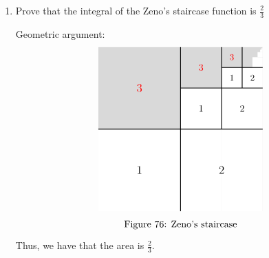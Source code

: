 \documentclass[11pt]{article}
\begin{document}
\begin{enumerate}
    \item 
    \begin{problem}
    Prove that the integral of the Zeno’s staircase function is $\frac{2}{3}$
    \end{problem}
    \begin{solution}
Geometric argument:
\[\begin{tikzpicture}
        \fill[gray!30] (0,0) rectangle (6,6);

        \fill[white] (0,0) rectangle (3,3);  %
        \fill[white] (3,0) rectangle (4.5,4.5);  %
        \fill[white] (4.5,0) rectangle (6,5.25);  %
        \fill[white] (5.625,5.25) rectangle (6,5.625);  %
        \fill[white] (5.8125,5.625) rectangle (6,5.8125);  %
        \fill[white] (5.90625,5.8125) rectangle (6,5.90625);  %
        \fill[white] (5.953125,5.90625) rectangle (6,5.953125);  %
        \fill[white] (5.9765625,5.953125) rectangle (6,5.9765625);  %
        \fill[white] (5.98828125,5.9765625) rectangle (6,5.98828125);  %
        \fill[white] (5.994140625,5.98828125) rectangle (6,5.994140625);  %

        \draw[thick] (3,0) -- (3,6);  %
        \draw[thick] (0,3) -- (6,3);  %
        \node at (1.5, 1.5) {\large 1};
        \node at (4.5, 1.5) {\large2};
        \node[red] at (1.5, 4.5) {\large3};
        \draw[thick] (4.5,3) -- (4.5,6);  %
        \draw[thick] (3,4.5) -- (6,4.5);  %
        \node at (3 + 6/8, 3 + 6/8) { 1};
        \node at (5.25, 3 + 6/8) { 2};
        \node[red] at (3 + 6/8, 5.25) { 3};
        
        \draw[thick] (4.5 + 6/8,4.5) -- (4.5 + 6/8,6);  %
        \draw[thick] (4.5, 4.5 + 6/8) -- (6, 4.5 + 6/8);  %
        \node at (4.5 + 3/8, 4.5 + 3/8) {\small 1};
        \node at (4.5 + 3/8 + 6/8, 4.5 + 3/8) {\small 2};
        \node[red] at (4.5 + 3/8, 4.5 + 3/8 + 6/8) {\small 3};
        \node at (3,-0.5) {Figure 76: Zeno's staircase};
    \end{tikzpicture}
    \]
    Thus, we have that the area is $\frac{2}{3}.$\\


\end{solution}
\end{enumerate}
\end{document}
